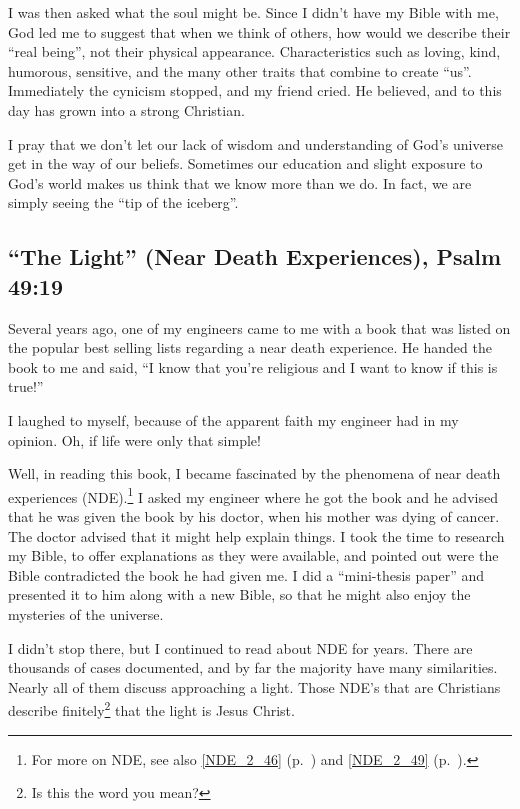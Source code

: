\documentclass[12pt]{memoir}
\begin{document}
I was then asked what the soul might be. Since I didn't have my Bible
with me, God led me to suggest that when we think of others, how would
we describe their ``real being'', not their physical appearance.
Characteristics such as loving, kind, humorous, sensitive, and the
many other traits that combine to create ``us''. Immediately the
cynicism stopped, and my friend cried. He believed, and to this day
has grown into a strong Christian.

I pray that we don't let our lack of wisdom and understanding of God's
universe get in the way of our beliefs. Sometimes our education and
slight exposure to God's world makes us think that we know more than
we do. In fact, we are simply seeing the ``tip of the iceberg''.

\subsection[``The Light'' (Near Death Experiences)]{``The Light'' (Near Death Experiences), Psalm 49:19}
\label{NDE_2_15}


Several years ago, one of my engineers came to me with a book that was listed on the popular best selling lists regarding a near death experience. He handed the book to me and said, ``I know
that you're religious and I want to know if this is true!''

I laughed
to myself, because of the apparent faith my engineer had in my opinion.
Oh, if life were only that simple!

Well, in reading this book, I became fascinated by the phenomena of near death
experiences (NDE).\footnote{For more on NDE, see also \ref{NDE_2_46} (p.\ \pageref{NDE_2_46}) and \ref{NDE_2_49} (p.\ \pageref{NDE_2_49}).} I asked my engineer where he got the book and
he advised that he was given the book by his doctor, when his mother
was dying of cancer. The doctor advised that it might help explain
things. I took the time to research my Bible, to offer explanations
as they were available, and pointed out were the Bible contradicted the book he had given me. I did a ``mini-thesis paper'' and presented it to him along with a new Bible, so that he might also enjoy the mysteries of the universe.

I didn't stop there, but I continued to read about NDE for years.
There are thousands of cases documented, and by far the majority have
many similarities. Nearly all of them discuss approaching a light.
Those NDE's that are Christians describe finitely\footnote{Is this the word you mean?} that the light is Jesus Christ.
\end{document}

